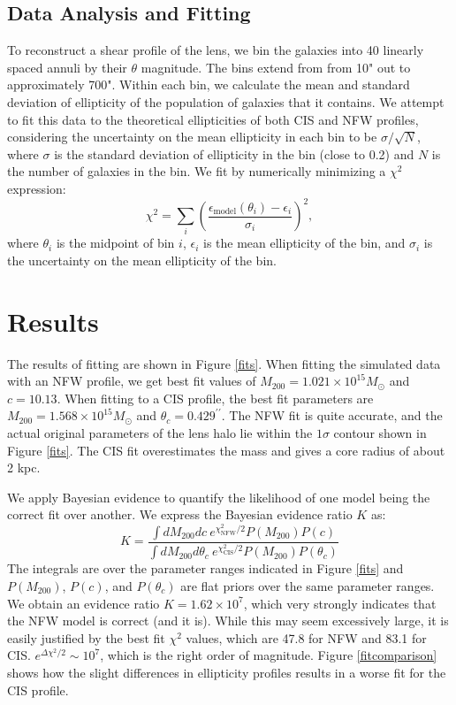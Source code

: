 \documentclass[10pt]{article}
\begin{document}
\subsection{Data Analysis and Fitting}
To reconstruct a shear profile of the lens, we bin the galaxies into 40 linearly spaced annuli by their $\theta$ magnitude. The bins extend from from 10" out to approximately 700". Within each bin, we calculate the mean and standard deviation of ellipticity of the population of galaxies that it contains. We attempt to fit this data to the theoretical ellipticities of both CIS and NFW profiles, considering the uncertainty on the mean ellipticity in each bin to be $\sigma / \sqrt{N}$, where $\sigma$ is the standard deviation of ellipticity in the bin (close to 0.2) and $N$ is the number of galaxies in the bin. We fit by numerically minimizing a $\chi^2$ expression:
\begin{equation}
\chi^2 = \sum_i{\left(\frac{\epsilon_\mathrm{model}(\theta_i) - \epsilon_i}{\sigma_i}\right)^2},
\end{equation}
where $\theta_i$ is the midpoint of bin $i$, $\epsilon_i$ is the mean ellipticity of the bin, and $\sigma_i$ is the uncertainty on the mean ellipticity of the bin.


\section{Results}
The results of fitting are shown in Figure \ref{fits}. When fitting the simulated data with an NFW profile, we  get best fit values of $M_{200} = 1.021 \times 10^{15} M_\odot$ and $c = 10.13$. When fitting to a CIS profile, the best fit parameters are $M_{200} = 1.568 \times 10^{15} M_\odot$ and $\theta_c = 0.429^{\prime \prime}$. The NFW fit is quite accurate, and the actual original parameters of the lens halo lie within the $1\sigma$ contour shown in Figure \ref{fits}. The CIS fit overestimates the mass and gives a core radius of about 2 kpc.

We apply Bayesian evidence to quantify the likelihood of one model being the correct fit over another. We express the Bayesian evidence ratio $K$ as:
\begin{equation}
K = \frac{\int dM_{200} dc\ e^{\chi^2_\mathrm{NFW} / 2} P(M_{200}) P(c)}{\int dM_{200} d\theta_c\ e^{\chi^2_\mathrm{CIS} / 2} P(M_{200}) P(\theta_c)}
\end{equation}
The integrals are over the parameter ranges indicated in Figure \ref{fits} and $P(M_{200})$, $P(c)$, and $P(\theta_c)$ are flat priors over the same parameter ranges. We obtain an evidence ratio $K = 1.62 \times 10^7$, which very strongly indicates that the NFW model is correct (and it is). While this may seem excessively large, it is easily justified by the best fit $\chi^2$ values, which are 47.8 for NFW and 83.1 for CIS. $e^{\Delta \chi^2 / 2} \sim 10^7$, which is the right order of magnitude. Figure \ref{fitcomparison} shows how the slight differences in ellipticity profiles results in a worse fit for the CIS profile.
\end{document}
